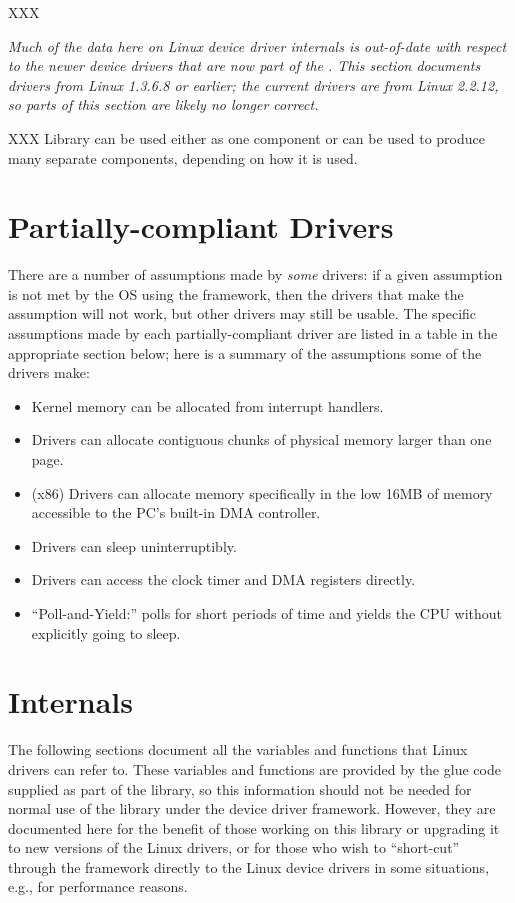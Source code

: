 XXX

\emph{Much of the data here on Linux device driver internals
is out-of-date with respect to the newer device drivers that are now
part of the \oskit{}.  This section documents drivers from Linux
1.3.6.8 or earlier; the current \oskit{} drivers are from Linux
2.2.12, so parts of this section are likely no longer correct.}


XXX Library can be used either as one component
or can be used to produce many separate components,
depending on how it is used.

\section{Partially-compliant Drivers}

There are a number of assumptions made by \emph{some} drivers:
if a given assumption is not met by the OS using the framework,
then the drivers that make the assumption will not work,
but other drivers may still be usable.
The specific assumptions made by each partially-compliant driver
are listed in a table in the appropriate section below;
here is a summary of the assumptions some of the drivers make:
\begin{itemize}
\item	Kernel memory can be allocated from interrupt handlers.
\item	Drivers can allocate contiguous chunks of physical memory
	larger than one page.
\item	(x86) Drivers can allocate memory specifically in the low 16MB
	of memory accessible to the PC's built-in DMA controller.
\item	Drivers can sleep uninterruptibly.
\item	Drivers can access the clock timer and DMA registers directly.
\item	``Poll-and-Yield:'' polls for short
	periods of time and yields the CPU without explicitly going to sleep.

\end{itemize}

\section{Internals}

The following sections document all the variables and functions that Linux
drivers can refer to.
These variables and functions are provided by the glue code
supplied as part of the library,
so this information should not be needed for normal use of the library
under the device driver framework.
However, they are documented here
for the benefit of those working on this library
or upgrading it to new versions of the Linux drivers,
or for those who wish to ``short-cut'' through the framework
directly to the Linux device drivers in some situations,
e.g., for performance reasons.


